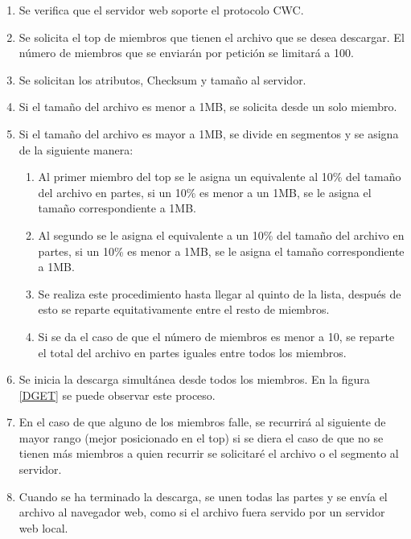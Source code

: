 \begin{enumerate}
\item Se verifica que el servidor web soporte el protocolo CWC.
\item Se solicita el top de miembros que tienen el archivo que se desea descargar. El número de miembros que se enviarán por petición se limitará a 100.
\item Se solicitan los atributos, Checksum y tamaño al servidor.
\item Si el tamaño del archivo es menor a 1MB, se solicita desde un solo miembro.
\item Si el tamaño del archivo es mayor a 1MB, se divide en segmentos y se asigna de la siguiente manera:

	\begin{enumerate}
	\item Al primer miembro del top se le asigna un equivalente al 10\% del tamaño del archivo en partes, si un 10\% es menor a un 1MB, se le asigna el tamaño correspondiente a 1MB.
	\item Al segundo se le asigna el equivalente a un 10\% del tamaño del archivo en partes, si un 10\% es menor a 1MB, se le asigna el tamaño correspondiente a 1MB. 
	\item Se realiza este procedimiento hasta llegar al quinto de la lista, después de esto se reparte equitativamente entre el resto de miembros.
	\item Si se da el caso de que el número de miembros es menor a 10, se reparte el total del archivo en partes iguales entre todos los miembros. 
	\end{enumerate}

\item Se inicia la descarga simultánea desde todos los miembros. En la figura \ref{DGET} se puede observar este proceso.

\item En el caso de que alguno de los miembros falle, se recurrirá al siguiente de mayor rango (mejor posicionado en el top) si se diera el caso de que no se tienen más miembros a quien recurrir se solicitaré el archivo o el segmento al servidor.

\item Cuando se ha terminado la descarga, se unen todas las partes y se envía el archivo al navegador web, como si el archivo fuera servido por un servidor web local.

\end{enumerate}

